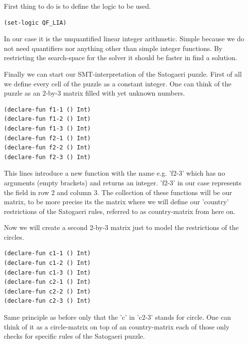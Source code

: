 \documentclass[a4paper,10pt]{paper}
\begin{document}
First thing to do is to define the logic to be used.
\begin{lstlisting}
(set-logic QF_LIA)
\end{lstlisting}
In our case it is the unquantified linear integer arithmetic. Simple because we do not need quantifiers nor anything other than simple integer functions. By restricting the search-space for the solver it should be faster in find a solution.

Finally we can start our SMT-interpretation of the Satogaeri puzzle. First of all we define every cell of the puzzle as a constant integer. One can think of the puzzle as an 2-by-3 matrix filled with yet unknown numbers.
\begin{lstlisting}
(declare-fun f1-1 () Int)
(declare-fun f1-2 () Int)
(declare-fun f1-3 () Int)
(declare-fun f2-1 () Int)
(declare-fun f2-2 () Int)
(declare-fun f2-3 () Int)
\end{lstlisting}
This lines introduce a new function with the name e.g. 'f2-3' which has no arguments (empty brackets) and returns an integer. 'f2-3' in our case represents the field in row 2 and column 3. The collection of these functions will be our matrix, to be more precise its the matrix where we will define our 'country' restrictions of the Satogaeri rules, referred to as country-matrix from here on.

Now we will create a second 2-by-3 matrix just to model the restrictions of the circles.
\begin{lstlisting}
(declare-fun c1-1 () Int)
(declare-fun c1-2 () Int)
(declare-fun c1-3 () Int)
(declare-fun c2-1 () Int)
(declare-fun c2-2 () Int)
(declare-fun c2-3 () Int)
\end{lstlisting}
Same principle as before only that the 'c' in 'c2-3' stands for circle.
One can think of it as a circle-matrix on top of an country-matrix each of those only checks for specific rules of the Satogaeri puzzle.
\end{document}
